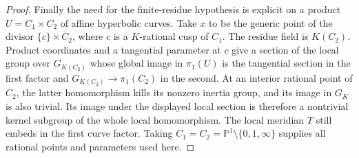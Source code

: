 \begin{proof}
Finally the need for the finite-residue hypothesis is explicit on a product $U=C_1\times C_2$ of affine hyperbolic curves. Take $x$ to be the generic point of the divisor $\{c\}\times\overline C_2$, where $c$ is a $K$-rational cusp of $C_1$. The residue field is $K(C_2)$. Product coordinates and a tangential parameter at $c$ give a section of the local group over $G_{K(C_2)}$ whose global image in $\pi_1(U)$ is the tangential section in the first factor and $G_{K(C_2)}\to\pi_1(C_2)$ in the second. At an interior rational point of $C_2$, the latter homomorphism kills its nonzero inertia group, and its image in $G_K$ is also trivial. Its image under the displayed local section is therefore a nontrivial kernel subgroup of the whole local homomorphism. The local meridian $T$ still embeds in the first curve factor. Taking $C_1=C_2=\mathbb P^1\setminus\{0,1,\infty\}$ supplies all rational points and parameters used here.
\end{proof}

